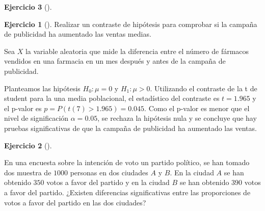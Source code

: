 \documentclass[
  a4paper,
]{scrreport}
\theoremstyle{definition}
\newtheorem{exercise}{Ejercicio}[chapter]
\theoremstyle{remark}
\begin{document}
\begin{exercise}[]
\begin{exercise}[]
Realizar un contraste de hipótesis para comprobar si la campaña de
publicidad ha aumentado las ventas medias.

\end{exercise}

\begin{tcolorbox}[enhanced jigsaw, colbacktitle=quarto-callout-tip-color!10!white, bottomrule=.15mm, bottomtitle=1mm, rightrule=.15mm, colback=white, left=2mm, opacityback=0, title=\textcolor{quarto-callout-tip-color}{\faLightbulb}\hspace{0.5em}{Solución}, leftrule=.75mm, arc=.35mm, titlerule=0mm, coltitle=black, opacitybacktitle=0.6, colframe=quarto-callout-tip-color-frame, breakable, toprule=.15mm, toptitle=1mm]

Sea \(X\) la variable aleatoria que mide la diferencia entre el número
de fármacos vendidos en una farmacia en un mes después y antes de la
campaña de publicidad.

Planteamos las hipótesis \(H_0: \mu = 0\) y \(H_1: \mu>0\). Utilizando
el contraste de la t de student para la una media poblacional, el
estadístico del contraste es \(t=1.965\) y el p-valor es
\(p = P(t(7)>1.965) = 0.045\). Como el p-valor es menor que el nivel de
significación \(\alpha = 0.05\), se rechaza la hipótesis nula y se
concluye que hay pruebas significativas de que la campaña de publicidad
ha aumentado las ventas.

\end{tcolorbox}

\begin{exercise}[]\protect\hypertarget{exr-contraste-proporciones-voto}{}\label{exr-contraste-proporciones-voto}

En una encuesta sobre la intención de voto un partido político, se han
tomado dos muestra de \(1000\) personas en dos ciudades \(A\) y \(B\).
En la ciudad \(A\) se han obtenido \(350\) votos a favor del partido y
en la ciudad \(B\) se han obtenido \(390\) votos a favor del partido.
¿Existen diferencias significativas entre las proporciones de votos a
favor del partido en las dos ciudades?

\end{exercise}

\begin{tcolorbox}[enhanced jigsaw, colbacktitle=quarto-callout-tip-color!10!white, bottomrule=.15mm, bottomtitle=1mm, rightrule=.15mm, colback=white, left=2mm, opacityback=0, title=\textcolor{quarto-callout-tip-color}{\faLightbulb}\hspace{0.5em}{Solución}, leftrule=.75mm, arc=.35mm, titlerule=0mm, coltitle=black, opacitybacktitle=0.6, colframe=quarto-callout-tip-color-frame, breakable, toprule=.15mm, toptitle=1mm]


\end{tcolorbox}
\end{exercise}
\end{document}

